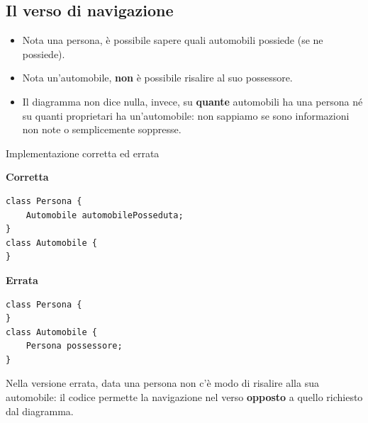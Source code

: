 \subsection{Il verso di navigazione}


\begin{center}
\end{center}

\begin{itemize}
  \item Nota una persona, è possibile sapere quali automobili possiede (se ne possiede).
  \item Nota un'automobile, \textbf{non} è possibile risalire al suo possessore.
  \item Il diagramma non dice nulla, invece, su \textbf{quante} automobili ha una persona né su quanti proprietari ha
        un'automobile: non sappiamo se sono informazioni non note o semplicemente soppresse.
\end{itemize}

\begin{esempio}{Implementazione corretta ed errata}
\noindent\begin{minipage}[t]{0.48\textwidth}
\textbf{\textcolor{swgreen}{Corretta}}
\begin{lstlisting}[style=java]
class Persona {
    Automobile automobilePosseduta;
}
class Automobile {
}
\end{lstlisting}
\end{minipage}\hfill
\begin{minipage}[t]{0.48\textwidth}
\textbf{\textcolor{swred}{Errata}}
\begin{lstlisting}[style=java]
class Persona {
}
class Automobile {
    Persona possessore;
}
\end{lstlisting}
\end{minipage}

\medskip
Nella versione errata, data una persona non c'è modo di risalire alla sua automobile: il codice permette la navigazione
nel verso \textbf{opposto} a quello richiesto dal diagramma.
\end{esempio}


